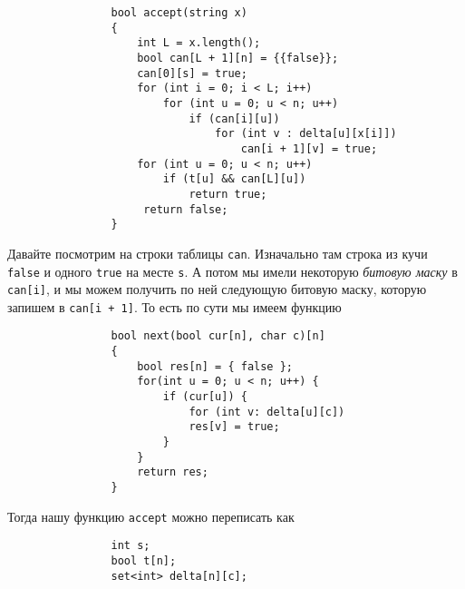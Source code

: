 \documentclass{article}
\begin{document}
\begin{itemize}
\begin{Proof}
\begin{verbatim}
                bool accept(string x)
                {
                    int L = x.length();
                    bool can[L + 1][n] = {{false}};
                    can[0][s] = true;
                    for (int i = 0; i < L; i++)
                        for (int u = 0; u < n; u++)
                            if (can[i][u])
                                for (int v : delta[u][x[i]])
                                    can[i + 1][v] = true;
                    for (int u = 0; u < n; u++)
                        if (t[u] && can[L][u])
                            return true;
                     return false;
                }
            \end{verbatim}
            Давайте посмотрим на строки таблицы \texttt{can}. Изначально там строка из кучи \texttt{false} и одного \texttt{true} на месте \texttt{s}. А потом мы имели некоторую \textit{битовую маску} в \texttt{can[i]}, и мы можем получить по ней следующую битовую маску, которую запишем в \texttt{can[i + 1]}. То есть по сути мы имеем функцию
            \begin{verbatim}
                bool next(bool cur[n], char c)[n]
                {
                    bool res[n] = { false };
                    for(int u = 0; u < n; u++) {
                        if (cur[u]) {
                            for (int v: delta[u][c])
                            res[v] = true;
                        }
                    }
                    return res;
                }
            \end{verbatim}
            Тогда нашу функцию \texttt{accept} можно переписать как
            \begin{verbatim}
                int s;
                bool t[n];
                set<int> delta[n][c];
                

\end{verbatim}
\end{Proof}
\end{itemize}
\end{document}
